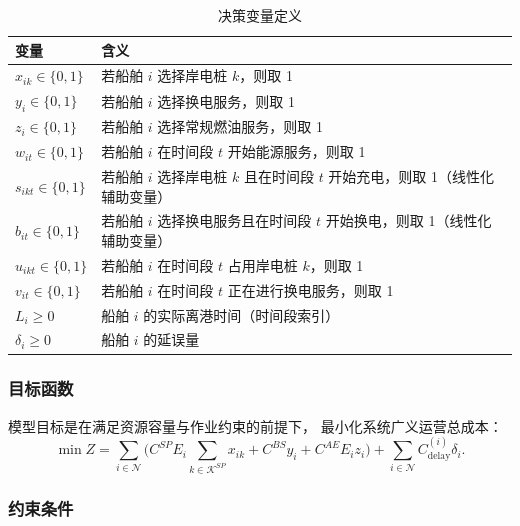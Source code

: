 \documentclass[UTF8, a4paper, 12pt]{ctexart}
\begin{document}
\begin{table}[htbp]
\centering
\caption{决策变量定义}
\begin{tabular}{ll}
\toprule
变量 & 含义 \\
\midrule
$x_{ik} \in \{0,1\}$ & 若船舶 $i$ 选择岸电桩 $k$，则取 1 \\
$y_i \in \{0,1\}$ & 若船舶 $i$ 选择换电服务，则取 1 \\
$z_i \in \{0,1\}$ & 若船舶 $i$ 选择常规燃油服务，则取 1 \\
$w_{it} \in \{0,1\}$ & 若船舶 $i$ 在时间段 $t$ 开始能源服务，则取 1 \\
$s_{ikt} \in \{0,1\}$ & 若船舶 $i$ 选择岸电桩 $k$ 且在时间段 $t$ 开始充电，则取 1（线性化辅助变量） \\
$b_{it} \in \{0,1\}$ & 若船舶 $i$ 选择换电服务且在时间段 $t$ 开始换电，则取 1（线性化辅助变量） \\
$u_{ikt} \in \{0,1\}$ & 若船舶 $i$ 在时间段 $t$ 占用岸电桩 $k$，则取 1 \\
$v_{it} \in \{0,1\}$ & 若船舶 $i$ 在时间段 $t$ 正在进行换电服务，则取 1 \\
$L_i \ge 0$ & 船舶 $i$ 的实际离港时间（时间段索引） \\
$\delta_i \ge 0$ & 船舶 $i$ 的延误量 \\
\bottomrule
\end{tabular}
\end{table}


\subsubsection{目标函数}

模型目标是在满足资源容量与作业约束的前提下，
最小化系统广义运营总成本：
\begin{equation}
\min Z =
\sum_{i \in \mathcal{N}}
\Big(
C^{SP} E_i \sum_{k \in \mathcal{K}^{SP}} x_{ik}
+ C^{BS} y_i
+ C^{AE} E_i z_i
\Big)
+ \sum_{i \in \mathcal{N}} C^{(i)}_{\text{delay}} \delta_i .
\label{eq:obj_24_final}
\end{equation}

\subsubsection{约束条件}
\end{document}

